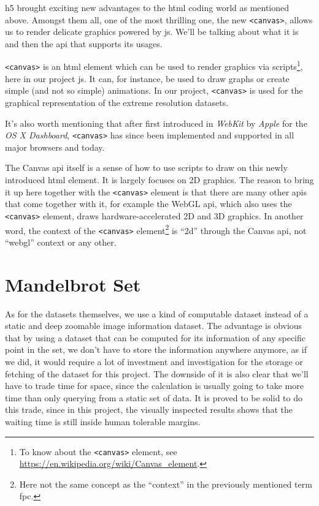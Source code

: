 \gls{h5} brought exciting new advantages to the \gls{html} coding world as mentioned above. Amongst them all, one of the most thrilling one, the new \texttt{<canvas>}, allows us to render delicate graphics powered by \gls{js}. We'll be talking about what it is and then the \gls{api} that supports its usages.

\texttt{<canvas>} is an \gls{html} element which can be used to render graphics via scripts\footnote{ To know about the \texttt{<canvas>} element, see \url{https://en.wikipedia.org/wiki/Canvas_element}.}, here in our project \gls{js}. It can, for instance, be used to draw graphs or create simple (and not so simple) animations. In our project, \texttt{<canvas>} is used for the graphical representation of the extreme resolution datasets.

It's also worth mentioning that after first introduced in \emph{WebKit} by \emph{Apple} for the \emph{OS X Dashboard}, \texttt{<canvas>} has since been implemented and supported in all major browsers and today.

The Canvas \gls{api} itself is a sense of how to use scripts to draw on this newly introduced \gls{html} element. It is largely focuses on 2D graphics. The reason to bring it up here together with the \texttt{<canvas>} element is that there are many other \gls{api}s that come together with it, for example the WebGL \gls{api}, which also uses the \texttt{<canvas>} element, draws hardware-accelerated 2D and 3D graphics. In another word, the context of the \texttt{<canvas>} element\footnote{ Here not the same concept as the ``context'' in the previously mentioned term \gls{fpc}.} is ``2d'' through the Canvas \gls{api}, not ``webgl'' context or any other.


\section{Mandelbrot Set}

As for the datasets themselves, we use a kind of computable dataset instead of a static and deep zoomable image information dataset. The advantage is obvious that by using a dataset that can be computed for its information of any specific point in the set, we don't have to store the information anywhere anymore, as if we did, it would require a lot of investment and investigation for the storage or fetching of the dataset for this project. The downside of it is also clear that we'll have to trade time for space, since the calculation is usually going to take more time than only querying from a static set of data. It is proved to be solid to do this trade, since in this project, the visually inspected results shows that the waiting time is still inside human tolerable margins.

